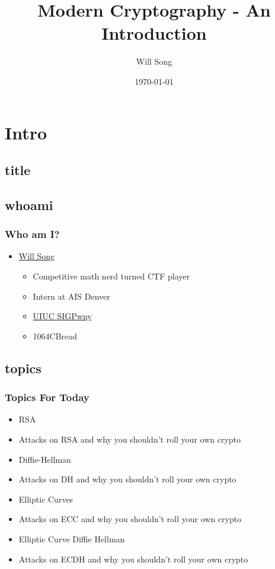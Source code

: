 \documentclass[aspectratio=169,t]{beamer}
\title{Modern Cryptography - An Introduction}
\author{Will Song}
\date{\today}
\begin{document}
\section{Intro}

\subsection{title}

\begin{frame}
\titlepage
\end{frame}

\subsection{whoami}
\begin{frame}
\frametitle{Who am I?}
\begin{itemize}
\item
\href{https://www.incertia.net/}{Will Song}
\begin{itemize}
\item
Competitive math nerd turned CTF player
\item
Intern at AIS Denver
\item
\href{https://sigpwny.github.io/}{UIUC SIGPwny}
\item
1064CBread
\end{itemize}
\end{itemize}
\end{frame}

\subsection{topics}
\begin{frame}
\frametitle{Topics For Today} \begin{itemize}
\item
RSA
\item
Attacks on RSA and why you shouldn't roll your own crypto
\item
Diffie-Hellman
\item
Attacks on DH and why you shouldn't roll your own crypto
\item
Elliptic Curves
\item
Attacks on ECC and why you shouldn't roll your own crypto
\item
Elliptic Curve Diffie Hellman
\item
Attacks on ECDH and why you shouldn't roll your own crypto
\end{itemize}
\end{frame}
\end{document}
